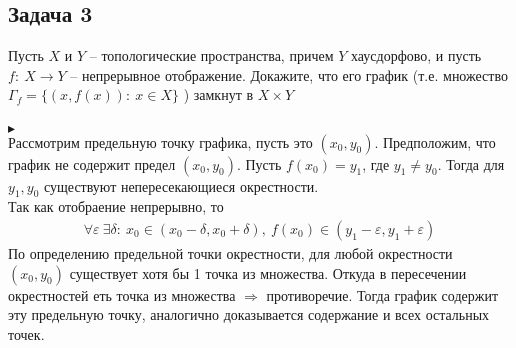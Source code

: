 		\subsection*{Задача 3}
		Пусть $X$ и $Y$ -- топологические пространства, причем $Y$ хаусдорфово, и пусть $f:\ X \to Y$ -- непрерывное отображение. Докажите, что его график (т.е. множество $\Gamma_f = \{(x,f(x)):\ x \in X\}$ )
		замкнут в $X \times Y$\\
		\\
		$\blacktriangleright$\\
		Рассмотрим предельную точку графика, пусть это $(x_0, y_0)$. Предположим, что график не содержит предел $(x_0, y_0)$. Пусть $f(x_0) = y_1$, где $y_1 \ne y_0$. Тогда для $y_1, y_0$ существуют непересекающиеся окрестности.\\
		Так как отобраение непрерывно, то
		\begin{gather*}
			\forall \varepsilon\ \exists \delta:\ x_0 \in (x_0 - \delta, x_0 + \delta),\ f(x_0) \in (y_1 - \varepsilon, y_1 + \varepsilon)
		\end{gather*}
		По определению предельной точки окрестности, для любой окрестности $(x_0, y_0)$ существует хотя бы 1 точка из множества. Откуда в пересечении окрестностей еть точка из множества $\Rightarrow$ противоречие. Тогда график содержит эту предельную точку, аналогично доказывается содержание и всех остальных точек.
		\\

